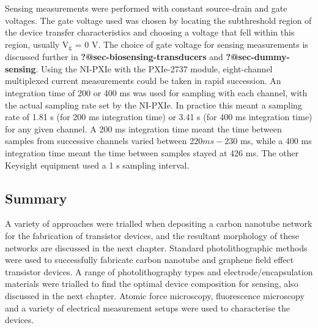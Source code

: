 \documentclass[
  letterpaper,
  DIV=11,
  numbers=noendperiod]{scrartcl}
\begin{document}
Sensing measurements were performed with constant source-drain and gate
voltages. The gate voltage used was chosen by locating the subthreshold
region of the device transfer characteristics and choosing a voltage
that fell within this region, usually V\(_{\mathrm{g}}\) = 0 V. The
choice of gate voltage for sensing measurements is discussed further in
\textbf{?@sec-biosensing-transducers} and \textbf{?@sec-dummy-sensing}.
Using the NI-PXIe with the PXIe-2737 module, eight-channel multiplexed
current measurements could be taken in rapid succession. An integration
time of 200 or 400 ms was used for sampling with each channel, with the
actual sampling rate set by the NI-PXIe. In practice this meant a
sampling rate of 1.81 s (for 200 ms integration time) or 3.41 s (for 400
ms integration time) for any given channel. A 200 ms integration time
meant the time between samples from successive channels varied between
\(220 ms-230\) ms, while a 400 ms integration time meant the time
between samples stayed at 426 ms. The other Keysight equipment used a 1
s sampling interval.

\hypertarget{summary}{%
\subsection{Summary}\label{summary}}

A variety of approaches were trialled when depositing a carbon nanotube
network for the fabrication of transistor devices, and the resultant
morphology of these networks are discussed in the next chapter. Standard
photolithographic methods were used to successfully fabricate carbon
nanotube and graphene field effect transistor devices. A range of
photolithography types and electrode/encapsulation materials were
trialled to find the optimal device composition for sensing, also
discussed in the next chapter. Atomic force microscopy, fluorescence
microscopy and a variety of electrical measurement setups were used to
characterise the devices.
\end{document}
